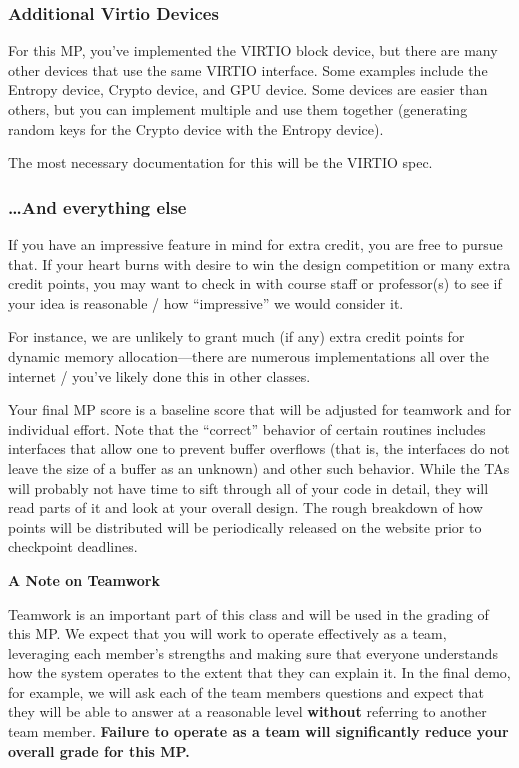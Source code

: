 \documentclass{article}
\begin{document}
\subsubsection{Additional Virtio Devices}
For this MP, you've implemented the VIRTIO block device, but there are many other devices that use the same VIRTIO interface.
Some examples include the Entropy device, Crypto device, and GPU device. Some devices are easier than others, but you can implement multiple
and use them together (\eg generating random keys for the Crypto device with the Entropy device).

The most necessary documentation for this will be the VIRTIO spec.

\subsubsection{\ldots And everything else}
%
If you have an impressive feature in mind for extra credit, you are free to pursue that.
If your heart burns with desire to win the design competition or many extra credit points, you may want to check in with course staff or professor(s) to see if your idea is reasonable / how ``impressive'' we would consider it.

For instance, we are unlikely to grant much (if any) extra credit points for dynamic memory allocation---there are numerous implementations all over the internet / you've likely done this in other classes.

\else
\fi

\pagebreak

Your final MP score is a baseline score that will be adjusted for
teamwork and for individual effort.
%
Note that the ``correct'' behavior of certain routines includes
interfaces that allow one to prevent buffer overflows (that is, the
interfaces do not leave the size of a buffer as an unknown) and other
such behavior.  While the TAs will probably not have time to sift
through all of your code in detail, they will read parts of it and look
at your overall design. The rough breakdown of how points will be distributed
will be periodically released on the website prior to checkpoint deadlines.

{\bf A Note on Teamwork}

Teamwork is an important part of this class and will be used in the
grading of this MP. We expect that you will work to operate effectively
as a team, leveraging each member's strengths and making sure that
everyone understands how the system operates to the extent that they
can explain it. In the final demo, for example, we will ask each
of the team members questions and expect that they will be able to
answer at a reasonable level {\bf without} referring to another team
member. {\bf Failure to operate as a team will significantly reduce your
		overall grade for this MP.}
\end{document}

